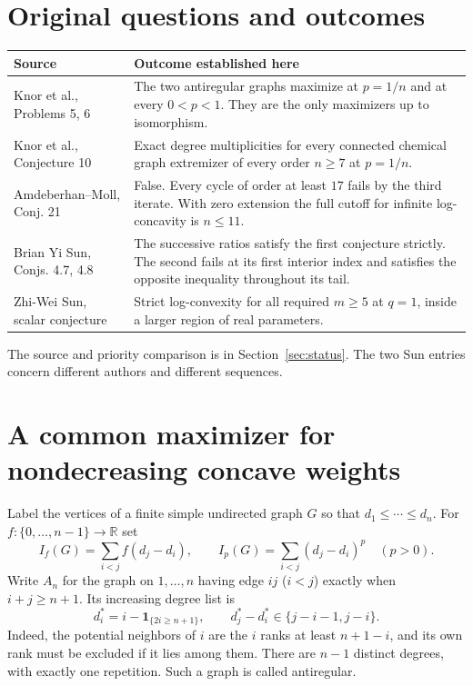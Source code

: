 \documentclass[11pt,a4paper]{article}
\theoremstyle{definition}\newtheorem{problem}[theorem]{Problem}
\begin{document}
\section*{Original questions and outcomes}
\small
\renewcommand{\arraystretch}{1.16}
\begin{tabularx}{\linewidth}{@{}p{.30\linewidth}X@{}}
\toprule
\textbf{Source} & \textbf{Outcome established here}\\
\midrule
Knor et al., Problems 5, 6 & The two antiregular graphs maximize at $p=1/n$ and at every $0<p<1$. They are the only maximizers up to isomorphism.\\
Knor et al., Conjecture 10 & Exact degree multiplicities for every connected chemical graph extremizer of every order $n\ge7$ at $p=1/n$.\\
Amdeberhan--Moll, Conj. 21 & False. Every cycle of order at least $17$ fails by the third iterate. With zero extension the full cutoff for infinite log-concavity is $n\le11$.\\
Brian Yi Sun, Conjs. 4.7, 4.8 & The successive ratios satisfy the first conjecture strictly. The second fails at its first interior index and satisfies the opposite inequality throughout its tail.\\
Zhi-Wei Sun, scalar conjecture & Strict log-convexity for all required $m\ge5$ at $q=1$, inside a larger region of real parameters.\\
\bottomrule
\end{tabularx}
\normalsize
\vspace{6pt}
\noindent The source and priority comparison is in Section~\ref{sec:status}.
The two Sun entries concern different authors and different sequences.
\clearpage
\section{A common maximizer for nondecreasing concave weights}
\label{sec:general}
Label the vertices of a finite simple undirected graph $G$ so that
$d_1\le\cdots\le d_n$. For $f\colon\{0,\ldots,n-1\}\to\mathbb R$ set
\[
 I_f(G)=\sum_{i<j} f(d_j-d_i),\qquad I_p(G)=\sum_{i<j}(d_j-d_i)^p
 \quad(p>0).
\]
Write $A_n$ for the graph on $1,\ldots,n$ having edge $ij$ ($i<j$)
exactly when $i+j\ge n+1$. Its increasing degree list is
\begin{equation}\label{eq:rankgap}
 d_i^*=i-\mathbf1_{\{2i\ge n+1\}},\qquad
 d_j^*-d_i^*\in\{j-i-1,j-i\}.
\end{equation}
Indeed, the potential neighbors of $i$ are the $i$ ranks at least $n+1-i$,
and its own rank must be excluded if it lies among them. There are $n-1$
distinct degrees, with exactly one repetition. Such a graph is called
antiregular.
\end{document}
